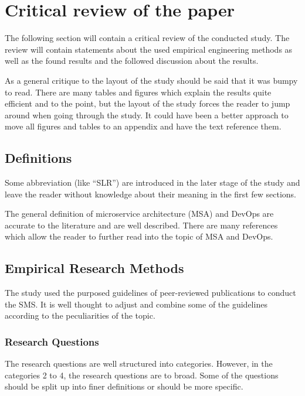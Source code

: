 \section{Critical review of the paper}

The following section will contain a critical review of the conducted study.
The review will contain statements about the used empirical engineering methods
as well as the found results and the followed discussion about the results.

As a general critique to the layout of the study should be said that it was
bumpy to read. There are many tables and figures which explain the results
quite efficient and to the point, but the layout of the study forces the
reader to jump around when going through the study. It could have been
a better approach to move all figures and tables to an appendix
and have the text reference them.

\subsection{Definitions}

Some abbreviation (like ``SLR'') are introduced in the later stage of
the study and leave the reader without knowledge about their meaning
in the first few sections.

The general definition of microservice architecture (MSA) and DevOps
are accurate to the literature and are well described. There are
many references which allow the reader to further read into the topic
of MSA and DevOps.

\subsection{Empirical Research Methods}

The study used the purposed guidelines of peer-reviewed publications
to conduct the SMS. It is well thought to adjust and combine some of the guidelines
according to the peculiarities of the topic.

\subsubsection{Research Questions}

The research questions are well structured into categories.
However, in the categories 2 to 4, the research questions are to broad.
Some of the questions should be split up into finer definitions or
should be more specific.

